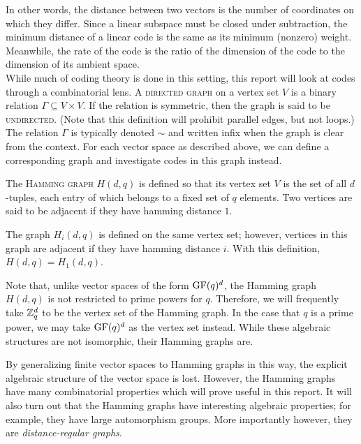\documentclass{report}
\begin{document}
    In other words, the distance between two vectors is the number of
    coordinates on which they differ.  Since a linear subspace must be closed
    under subtraction, the minimum distance of a linear code is the same as its
    minimum (nonzero) weight.  Meanwhile, the rate of the code is the ratio of
    the dimension of the code to the dimension of its ambient space.
    \\

    While much of coding theory is done in this setting, this report will look
    at codes through a combinatorial lens.  A \textsc{directed graph} on a
    vertex set $V$ is a binary relation $\Gamma \subseteq V \times V$.  If the
    relation is symmetric, then the graph is said to be \textsc{undirected}.
    (Note that this definition will prohibit parallel edges, but not loops.) The
    relation $\Gamma$ is typically denoted $\sim$ and written infix when the
    graph is clear from the context.  For each vector space as described above,
    we can define a corresponding graph and investigate codes in this graph
    instead.

    \begin{defn}\label{hamming-graph}
      The \textsc{Hamming graph} $H(d, q)$ is defined so that its vertex set $V$
      is the set of all $d$-tuples, each entry of which belongs to a fixed set
      of $q$ elements.  Two vertices are said to be adjacent if they have
      hamming distance $1$.

      The graph $H_i(d, q)$ is defined on the same vertex set; however, vertices
      in this graph are adjacent if they have hamming distance $i$.  With this
      definition, $H(d, q) = H_1(d, q)$.
    \end{defn}

    Note that, unlike vector spaces of the form $\operatorname{GF}(q)^d$, the Hamming graph
    $H(d, q)$ is not restricted to prime powers for $q$.  Therefore, we will
    frequently take $\mathbb{Z}_q^d$ to be the vertex set of the Hamming graph.  In the
    case that $q$ is a prime power, we may take $\operatorname{GF}(q)^d$ as the vertex set
    instead.  While these algebraic structures are not isomorphic, their Hamming
    graphs are.

    By generalizing finite vector spaces to Hamming graphs in this way, the
    explicit algebraic structure of the vector space is lost.  However, the
    Hamming graphs have many combinatorial properties which will prove useful in
    this report.  It will also turn out that the Hamming graphs have interesting
    algebraic properties; for example, they have large automorphism groups.
    More importantly however, they are \textit{distance-regular graphs}.
\end{document}
